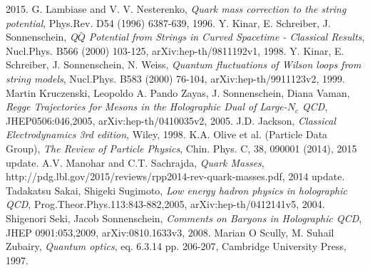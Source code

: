 \documentclass[11pt,a4paper]{article}
\begin{document}
\begin{thebibliography}{9}
	2015.
	G. Lambiase and V. V. Nesterenko,
	\emph{Quark mass correction to the string potential},
	Phys.Rev. D54 (1996) 6387-639,
	1996.
	Y. Kinar, E. Schreiber, J. Sonnenschein,
	\emph{Q$\bar{Q}$ Potential from Strings in Curved Spacetime - Classical Results},
	Nucl.Phys. B566 (2000) 103-125,
	arXiv:hep-th/9811192v1,
	1998.
	Y. Kinar, E. Schreiber, J. Sonnenschein, N. Weiss,
	\emph{Quantum fluctuations of Wilson loops from string models},
	Nucl.Phys. B583 (2000) 76-104,
	arXiv:hep-th/9911123v2,
	1999.
	Martin Kruczenski, Leopoldo A. Pando Zayas, J. Sonnenschein, Diana Vaman,
	\emph{Regge Trajectories for Mesons in the Holographic Dual of Large-$N_c$ QCD},
	JHEP0506:046,2005,
	arXiv:hep-th/0410035v2,
	2005.
	J.D. Jackson,
	\emph{Classical Electrodynamics 3rd edition},
	Wiley,
	1998.	
	K.A. Olive et al. (Particle Data Group),
	\emph{The Review of Particle Physics},
	Chin. Phys. C, 38, 090001 (2014),
	2015 update.
	A.V. Manohar and C.T. Sachrajda,
	\emph{Quark Masses},
	http://pdg.lbl.gov/2015/reviews/rpp2014-rev-quark-masses.pdf,
	2014 update.	
	Tadakatsu Sakai, Shigeki Sugimoto,
	\emph{Low energy hadron physics in holographic QCD},
	Prog.Theor.Phys.113:843-882,2005,
	arXiv:hep-th/0412141v5,
	2004.
	Shigenori Seki, Jacob Sonnenschein,
	\emph{Comments on Baryons in Holographic QCD},
	JHEP 0901:053,2009,
	arXiv:0810.1633v3,
	2008.
	Marian O Scully, M. Suhail Zubairy,
	\emph{Quantum optics},  eq. 6.3.14 pp. 206-207,
	Cambridge University Press,
	1997.
	
\end{thebibliography}
\end{document}
